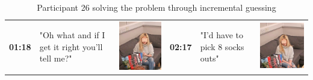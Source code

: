 \documentclass[twocolumn, issue, empirical, authordate,drafn]{jote-new-article}
\begin{document}
\begin{table}[ht!] 
\caption{Participant 26 solving the problem through incremental guessing}
\label{tab:table2}
\renewcommand{\arraystretch}{1.5}
\begin{fullwidth}
\begin{tabularx}{\linewidth}{@{} m{.05\linewidth} m{.28\linewidth} >{\raggedleft\arraybackslash}m{.1\linewidth}  m{.05\linewidth} m{.28\linewidth} >{\raggedleft\arraybackslash}m{.1\linewidth} @{}}
 \textbf{01:18}  & "Oh what and if I get it right you'll tell me?"  &  \includegraphics[height=.09\textheight, valign=t]{media/image14.png}  &
 \textbf{02:17} & "I'd have to pick 8 socks outs" & \includegraphics[height=.09\textheight, valign=t]{media/image22.png} \\ 
 

\end{tabularx}
\end{fullwidth}
\end{table}
\end{document}
